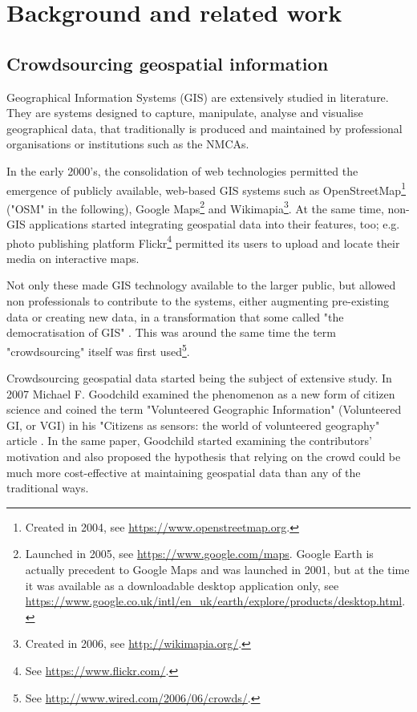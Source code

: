 \section{Background and related work}

\subsection{Crowdsourcing geospatial information}

Geographical Information Systems (GIS) are extensively studied in literature. They are systems designed to capture, manipulate, analyse and visualise geographical data, that traditionally is produced and maintained by professional organisations or institutions such as the NMCAs. 

In the early 2000's, the consolidation of web technologies permitted the emergence of publicly available, web-based GIS systems such as OpenStreetMap\footnote{Created in 2004, see \url{https://www.openstreetmap.org}.} ("OSM" in the following), Google Maps\footnote{Launched in 2005, see \url{https://www.google.com/maps}. Google Earth is actually precedent to Google Maps and was launched in 2001, but at the time it was available as a downloadable desktop application only, see \url{https://www.google.co.uk/intl/en_uk/earth/explore/products/desktop.html}.} and Wikimapia\footnote{Created in 2006, see \url{http://wikimapia.org/}.}. At the same time, non-GIS applications started integrating geospatial data into their features, too; e.g. photo publishing platform Flickr\footnote{See \url{https://www.flickr.com/}.} permitted its users to upload and locate their media on interactive maps. 

Not only these made GIS technology available to the larger public, but allowed non professionals to contribute to the systems, either augmenting pre-existing data or creating new data, in a transformation that some called "the democratisation of GIS" \cite{Butler:2006fe}. This was around the same time the term "crowdsourcing" itself was first used\footnote{See \url{http://www.wired.com/2006/06/crowds/}.}.

Crowdsourcing geospatial data started being the subject of extensive study. In 2007 Michael F. Goodchild examined the phenomenon as a new form of citizen science and coined the term "Volunteered Geographic Information" (Volunteered GI, or VGI) in his "Citizens as sensors: the world of volunteered geography" article \cite{Goodchild:2007vt}. In the same paper, Goodchild started examining the contributors' motivation and also proposed the hypothesis that relying on the crowd could be much more cost-effective at maintaining geospatial data than any of the traditional ways. 

